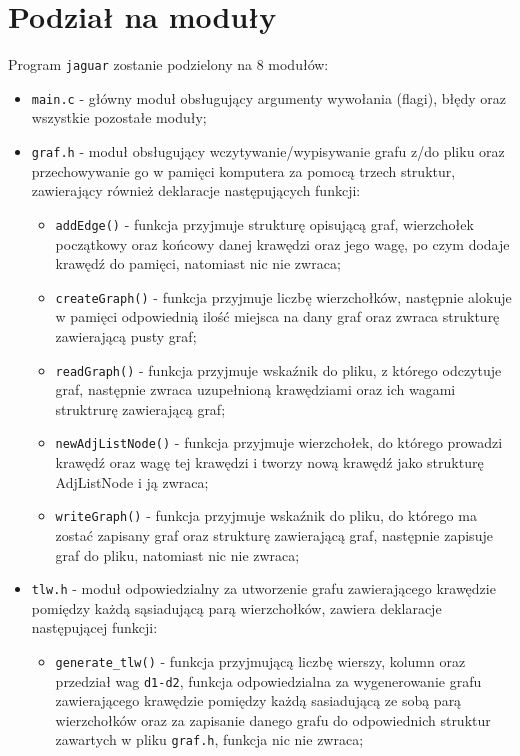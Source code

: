 \documentclass[]{article}
\begin{document}
\section{Podział na moduły}\label{header-n279}
Program \texttt{jaguar} zostanie podzielony na 8 modułów:
\begin{itemize}
\item
\texttt{main.c} - główny moduł obsługujący argumenty wywołania (flagi), błędy oraz wszystkie pozostałe moduły;
\item
\texttt{graf.h} -  moduł obsługujący wczytywanie/wypisywanie grafu z/do pliku oraz przechowywanie go w pamięci komputera za pomocą trzech struktur, zawierający również deklaracje następujących funkcji:
\begin{itemize}
\item
\texttt{addEdge()} - funkcja przyjmuje strukturę opisującą graf, wierzchołek początkowy oraz końcowy danej krawędzi oraz jego wagę, po czym dodaje krawędź do pamięci, natomiast nic nie zwraca;
\item
\texttt{createGraph()} - funkcja przyjmuje liczbę wierzchołków, następnie alokuje w pamięci odpowiednią ilość miejsca na dany graf oraz zwraca strukturę zawierającą pusty graf;
\item
\texttt{readGraph()} - funkcja przyjmuje wskaźnik do pliku, z którego odczytuje graf, następnie zwraca uzupełnioną krawędziami oraz ich wagami struktrurę zawierającą graf;
\item
\texttt{newAdjListNode()} - funkcja przyjmuje wierzchołek, do którego prowadzi krawędź oraz wagę tej krawędzi i tworzy nową krawędź jako strukturę AdjListNode i ją zwraca;
\item
\texttt{writeGraph()} - funkcja przyjmuje wskaźnik do pliku, do którego ma zostać zapisany graf oraz strukturę zawierającą graf, następnie zapisuje graf do pliku, natomiast nic nie zwraca;
\end{itemize} 
\item
\texttt{tlw.h} - moduł odpowiedzialny za utworzenie grafu zawierającego krawędzie pomiędzy każdą sąsiadującą parą wierzchołków, zawiera deklaracje następującej funkcji:
\begin{itemize}
\item
\verb|generate_tlw()| - funkcja przyjmującą liczbę wierszy, kolumn oraz przedział wag \texttt{d1-d2}, funkcja odpowiedzialna za wygenerowanie grafu zawierającego krawędzie pomiędzy każdą sasiadującą ze sobą parą wierzchołków oraz za zapisanie danego grafu do odpowiednich struktur zawartych w pliku \texttt{graf.h}, funkcja nic nie zwraca;

\end{itemize}
\end{itemize}
\end{document}

